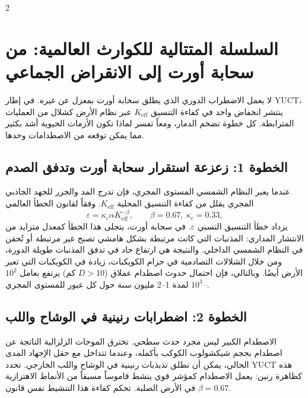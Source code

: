 \documentclass[11pt,a4paper]{article}
\begin{document}
	\begin{multicols}{2}
		
		\section{السلسلة المتتالية للكوارث العالمية: من سحابة أورت إلى الانقراض الجماعي}
		لا يعمل الاضطراب الدوري الذي يطلق سحابة أورت بمعزل عن غيره. في إطار YUCT، ينتشر انخفاض واحد في كفاءة التنسيق \(K_{\mathrm{eff}}\) عبر نظام الأرض كشلال من العمليات المترابطة. كل خطوة تضخم الدمار، ومعاً تفسر لماذا تكون الأزمات الحيوية أشد بكثير مما يمكن توقعه من الاصطدامات وحدها.
		
		\subsection{الخطوة 1: زعزعة استقرار سحابة أورت وتدفق الصدم}
		عندما يعبر النظام الشمسي المستوى المجري، فإن تدرج المد والجزر للجهد الجاذبي المجري يقلل من كفاءة التنسيق المحلية \(K_{\mathrm{eff}}\). وفقاً لقانون الخطأ العالمي
		\begin{equation}
			\varepsilon = \kappa_c \alpha K_{\mathrm{eff}}^{-\beta},\qquad \beta=0.67,\ \kappa_c=0.33,
		\end{equation}
		يزداد خطأ التنسيق النسبي \(\varepsilon\). في سحابة أورت، يتجلى هذا الخطأ كمعدل متزايد من الانتشار المداري: المذنبات التي كانت مرتبطة بشكل هامشي تصبح غير مرتبطة أو تُحقن في النظام الشمسي الداخلي. والنتيجة هي ارتفاع حاد في تدفق المذنبات طويلة الدورة، ومن خلال الشلالات التصادمية في حزام الكويكبات، زيادة في الكويكبات التي تعبر الأرض أيضًا. وبالتالي، فإن احتمال حدوث اصطدام عملاق (\(D>10\) كم) يرتفع بعامل \(10^2\)–\(10^3\) لمدة 1–2 مليون سنة حول كل عبور للمستوى المجري.
		
		\subsection{الخطوة 2: اضطرابات رنينية في الوشاح واللب}
		الاصطدام الكبير ليس مجرد حدث سطحي. تخترق الموجات الزلزالية الناتجة عن اصطدام بحجم شيكشولوب الكوكب بأكمله، وعندما تتداخل مع حقل الإجهاد المدى الحالي، يمكن أن تطلق تذبذبات رنينية في الوشاح واللب الخارجي. تحدد YUCT هذه كظاهرة رنين: يعمل الاصطدام كمؤشر قوي ينشط قاموساً مسبقاً من الأنماط الاهتزازية في الأرض الصلبة. تحكم كفاءة هذا التنشيط نفس قانون \(\beta = 0.67\).
		

\end{multicols}
\end{document}
